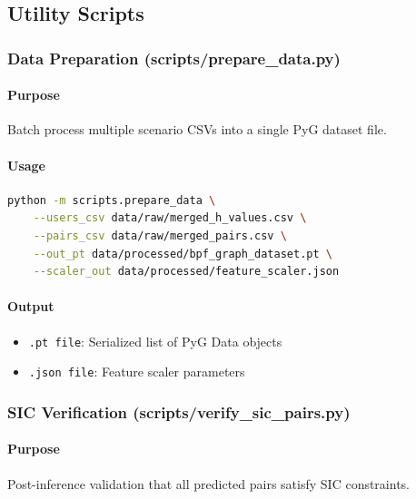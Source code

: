 \documentclass[12pt,a4paper]{article}
\begin{document}
\subsection{Utility Scripts}

\subsubsection{Data Preparation (scripts/prepare\_data.py)}

\paragraph{Purpose}
Batch process multiple scenario CSVs into a single PyG dataset file.

\paragraph{Usage}
\begin{lstlisting}[language=bash]
python -m scripts.prepare_data \
    --users_csv data/raw/merged_h_values.csv \
    --pairs_csv data/raw/merged_pairs.csv \
    --out_pt data/processed/bpf_graph_dataset.pt \
    --scaler_out data/processed/feature_scaler.json
\end{lstlisting}

\paragraph{Output}
\begin{itemize}
    \item \texttt{.pt file}: Serialized list of PyG Data objects
    \item \texttt{.json file}: Feature scaler parameters
\end{itemize}

\subsubsection{SIC Verification (scripts/verify\_sic\_pairs.py)}

\paragraph{Purpose}
Post-inference validation that all predicted pairs satisfy SIC constraints.
\end{document}
